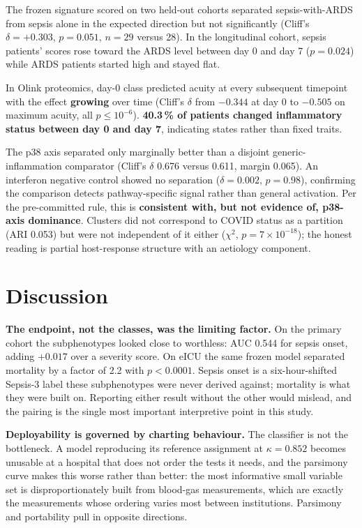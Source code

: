 \documentclass[11pt,letterpaper]{article}
\begin{document}
The frozen signature scored on two held-out cohorts separated sepsis-with-ARDS from sepsis
alone in the expected direction but not significantly (Cliff's $\delta = +0.303$,
$p = 0.051$, $n = 29$ versus 28). In the longitudinal cohort, sepsis patients' scores rose
toward the ARDS level between day 0 and day 7 ($p = 0.024$) while ARDS patients started high
and stayed flat.

In Olink proteomics, day-0 class predicted acuity at every subsequent timepoint with the
effect \textbf{growing} over time (Cliff's $\delta$ from $-0.344$ at day 0 to $-0.505$ on
maximum acuity, all $p \le 10^{-6}$). \textbf{40.3\,\% of patients changed inflammatory
status between day 0 and day 7}, indicating states rather than fixed traits.

The p38 axis separated only marginally better than a disjoint generic-inflammation
comparator (Cliff's $\delta$ 0.676 versus 0.611, margin 0.065). An interferon negative
control showed no separation ($\delta = 0.002$, $p = 0.98$), confirming the comparison
detects pathway-specific signal rather than general activation. Per the pre-committed rule,
this is \textbf{consistent with, but not evidence of, p38-axis dominance}. Clusters did not
correspond to COVID status as a partition (ARI 0.053) but were not independent of it either
($\chi^2$, $p = 7 \times 10^{-18}$); the honest reading is partial host-response structure
with an aetiology component.

\section{Discussion}

\textbf{The endpoint, not the classes, was the limiting factor.} On the primary cohort the
subphenotypes looked close to worthless: AUC 0.544 for sepsis onset, adding $+0.017$ over a
severity score. On eICU the same frozen model separated mortality by a factor of 2.2 with
$p < 0.0001$. Sepsis onset is a six-hour-shifted Sepsis-3 label these subphenotypes were
never derived against; mortality is what they were built on. Reporting either result without
the other would mislead, and the pairing is the single most important interpretive point in
this study.

\textbf{Deployability is governed by charting behaviour.} The classifier is not the
bottleneck. A model reproducing its reference assignment at $\kappa = 0.852$ becomes
unusable at a hospital that does not order the tests it needs, and the parsimony curve makes
this worse rather than better: the most informative small variable set is disproportionately
built from blood-gas measurements, which are exactly the measurements whose ordering varies
most between institutions. Parsimony and portability pull in opposite directions.
\end{document}
